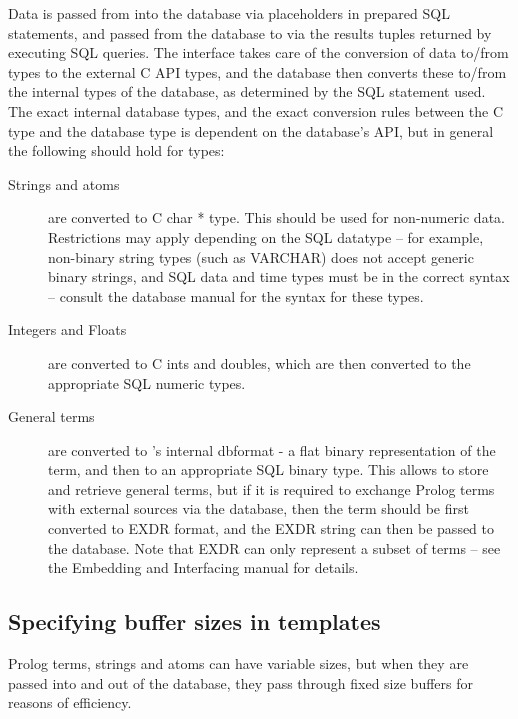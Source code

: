 Data is passed from {\eclipse\/} into the database via placeholders in
prepared SQL statements, and passed from the database to {\eclipse\/} via
the results tuples returned by executing SQL queries. 
The interface takes care of the conversion of data to/from {\eclipse\/}
types to the external C API types, and the database then converts these to/from
the internal types of the database, as determined by the SQL statement used. 
The exact internal database types, and the exact conversion rules between
the C type and the database type is dependent on the database's API, but in
general the following should hold for {\eclipse\/} types:

\begin{description}
\item[Strings and atoms] are converted to C char * type. This should be used for 
  non-numeric data. Restrictions may apply depending on the SQL datatype --
  for example, non-binary string types (such as VARCHAR) does not accept
  generic binary strings, and SQL data and time types must be in the
  correct syntax -- consult the database manual for the syntax for these types.
\item[Integers and Floats] are converted to C ints and doubles, which are
  then converted to the appropriate SQL numeric types.
\item[General terms] are converted to {\eclipse}'s internal dbformat
 - a flat binary representation of the term, and then to an appropriate SQL
 binary type. This 
 allows {\eclipse\/} to store and retrieve general terms, but if it is
 required to exchange Prolog terms with external sources via the
 database, then the term should be first converted to EXDR format, and the
 EXDR string can then be passed to the database. Note that EXDR can only
 represent a subset of terms -- see the Embedding and Interfacing manual
 for details.

\end{description}


\subsection{Specifying buffer sizes in templates}
Prolog terms, strings and atoms can have variable sizes, but when they are
passed into and out of the database, they pass through fixed size buffers
for reasons of efficiency.

